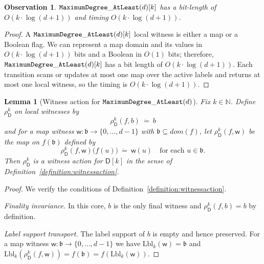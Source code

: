 \documentclass[11pt,a4paper]{article}
\newtheorem{lemma}[theorem]{Lemma}
\newtheorem{observation}[theorem]{Observation}
\newcommand{\treewidthvalue}{k}
\newcommand{\N}{\mathbb{N}}
\newcommand{\abag}{\mathfrak{b}}
\newcommand{\defeq}{~\dot{=}~}
\newcommand{\awitness}{\mathsf{w}}
\newcommand{\dpcore}{\mathsf{D}}
\newcommand{\dpNamePart}[1]{\mbox{\normalfont\ttfamily #1}}
\newcommand{\maxDegreeAtLeastCore}[1]{\dpNamePart{MaximumDegree}\_\allowbreak\dpNamePart{AtLeast}(#1)}
\newcommand{\domain}{dom}
\newcommand{\maxdegreeparameter}{d}
\newcommand{\maxdegreefound}{b}
\newcommand{\relabelingfunction}{f}
\newcommand{\action}{\rho}
\begin{document}
{\begin{observation}
\label{observation:ComplexityMeasuresMaxDegree}
$\maxDegreeAtLeastCore{\maxdegreeparameter}[\treewidthvalue]$ has a bit-length of
$O(\treewidthvalue\cdot \log(\maxdegreeparameter+1))$ and timing
$O(\treewidthvalue\cdot \log(\maxdegreeparameter+1))$.
\end{observation}
\begin{proof}
A $\maxDegreeAtLeastCore{\maxdegreeparameter}[\treewidthvalue]$ local witness is either a map or a Boolean flag. We can represent a map domain and its values in $O(\treewidthvalue\cdot \log(\maxdegreeparameter+1))$ bits and a Boolean in $O(1)$ bits; therefore, $\maxDegreeAtLeastCore{\maxdegreeparameter}[\treewidthvalue]$ has a bit length of $O(\treewidthvalue\cdot\log(\maxdegreeparameter+1))$. Each transition scans or updates at most one map over the active labels and returns at most one local witness, so the timing is $O(\treewidthvalue\cdot \log(\maxdegreeparameter+1))$.
\end{proof}

\begin{lemma}[Witness action for $\maxDegreeAtLeastCore{\maxdegreeparameter}$]
\label{lemma:witness-action-maxdegree}
Fix $\treewidthvalue\in \N$.
Define $\action_{\dpcore}^{\treewidthvalue}$ on local witnesses by
\[
\action_{\dpcore}^{\treewidthvalue}(\relabelingfunction,\maxdegreefound)\defeq \maxdegreefound
\]
and for a map witness $\awitness:\abag\to\{0,\dots,\maxdegreeparameter-1\}$ with $\abag\subseteq \domain(\relabelingfunction)$,
let $\action_{\dpcore}^{\treewidthvalue}(\relabelingfunction,\awitness)$ be the map on $\relabelingfunction(\abag)$ defined by
\[
\action_{\dpcore}^{\treewidthvalue}(\relabelingfunction,\awitness)\bigl(\relabelingfunction(u)\bigr)\defeq \awitness(u)
\quad\text{for each }u\in \abag.
\]
Then $\action_{\dpcore}^{\treewidthvalue}$ is a witness action for $\dpcore[\treewidthvalue]$ in the sense of Definition~\ref{definition:witnessaction}.
\end{lemma}
\begin{proof}
We verify the conditions of Definition~\ref{definition:witnessaction}.

\smallskip\noindent
\emph{Finality invariance.}
In this core, $\maxdegreefound$ is the only final witness and $\action_{\dpcore}^{\treewidthvalue}(\relabelingfunction,\maxdegreefound)=\maxdegreefound$ by definition.

\smallskip\noindent
\emph{Label support transport.}
The label support of $\maxdegreefound$ is empty and hence preserved. For a map witness $\awitness:\abag\to\{0,\dots,\maxdegreeparameter-1\}$ we have $\mathrm{Lbl}_{\treewidthvalue}(\awitness)=\abag$ and $\mathrm{Lbl}_{\treewidthvalue}(\action_{\dpcore}^{\treewidthvalue}(\relabelingfunction,\awitness))=\relabelingfunction(\abag)=\relabelingfunction(\mathrm{Lbl}_{\treewidthvalue}(\awitness))$.


\end{proof}}
\end{document}
